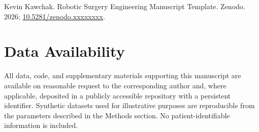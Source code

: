 Kevin Kawchak. Robotic Surgery Engineering Manuscript Template. Zenodo. 2026;
\href{https://doi.org/10.5281/zenodo.xxxxxxxx}{10.5281/zenodo.xxxxxxxx}.

{}
\section*{Data Availability}
\label{sec:data}

All data, code, and supplementary materials supporting this manuscript are
available on reasonable request to the corresponding author and, where
applicable, deposited in a publicly accessible repository with a persistent
identifier. Synthetic datasets used for illustrative purposes are
reproducible from the parameters described in the Methods section. No
patient-identifiable information is included.
